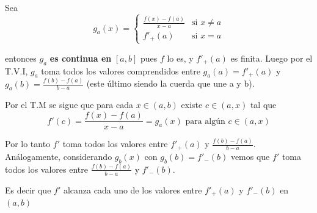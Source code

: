 \begin{prueba}
    Sea \[g_a(x) =  \begin{cases}
		\frac{f(x)-f(a)}{x-a}  &\text{si } x \neq a \\
		f'_{+}(a) &\text{si } x = a
	\end{cases}\]
	
	entonces \(g_a\) \textbf{es continua en} \([a,b]\) pues \(f\) lo es, y \(f'_{+}(a)\)  es finita. Luego por el T.V.I, \(g_a\) toma todos los valores comprendidos entre \(g_a(a) = f'_{+}(a)\) y \(g_a(b) = \frac{f(b)-f(a)}{b-a}\) (este último siendo la cuerda que une a y b). 
	
	Por el T.M se sigue que para cada \(x \in (a,b)\) existe \(c \in (a,x)\) tal que \[f'(c) = \frac{f(x)-f(a)}{x-a} = g_a(x) \text{ para algún } c \in (a,x)\]
	
	Por lo tanto \(f'\) toma todos los valores entre \(f'_{+}(a)\) y \(\frac{f(b)-f(a)}{b-a}\). Análogamente, considerando \(g_b(x)\) con \(g_b(b) = f'_{-}(b)\) vemos que \(f'\) toma todos los valores entre \(\frac{f(b)-f(a)}{b-a}\) y \(f'_{-}(b)\). 
	
	Es decir que \(f'\) alcanza cada uno de los valores entre \(f'_{+}(a)\)  y \(f'_{-}(b)\) en \((a,b)\)
\end{prueba}

